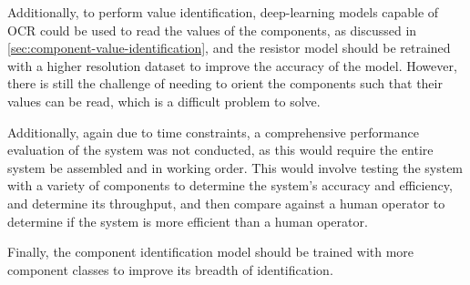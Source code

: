 Additionally, to perform value identification, deep-learning models capable of OCR could be used to read the values of the components, as discussed in \autoref{sec:component-value-identification}, and the resistor model should be retrained with a higher resolution dataset to improve the accuracy of the model.
However, there is still the challenge of needing to orient the components such that their values can be read, which is a difficult problem to solve.

Additionally, again due to time constraints, a comprehensive performance evaluation of the system was not conducted, as this would require the entire system be assembled and in working order. This would involve testing the system with a variety of components to determine the system's accuracy and efficiency, and determine its throughput, and then compare against a human operator to determine if the system is more efficient than a human operator.

Finally, the component identification model should be trained with more component classes to improve its breadth of identification.
